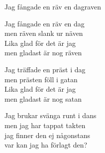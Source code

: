 \begin{song}{Jag fångade en räv en dag}{raven}
\begin{vers}
Jag fångade en räv en dag\\
men räven slank ur näven\\
Lika glad för det är jag\\
men gladast är nog räven\\
\end{vers}
\begin{vers}
Jag träffade en präst i dag\\
men prästen föll i gatan\\
Lika glad för det är jag\\
men gladast är nog satan\\
\end{vers}

\begin{vers}
Jag brukar svänga runt i dans\\
men jag har tappat takten\\
jag finner den ej någonstans\\
var kan jag ha förlagt den?\\
\end{vers}

\end{song}
